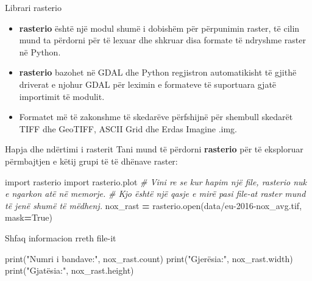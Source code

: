 \documentclass[
  ignorenonframetext,
]{beamer}
\newenvironment{Shaded}{\begin{snugshade}}{\end{snugshade}}
\newcommand{\BuiltInTok}[1]{#1}
\newcommand{\CommentTok}[1]{\textcolor[rgb]{0.56,0.35,0.01}{\textit{#1}}}
\newcommand{\ImportTok}[1]{#1}
\newcommand{\NormalTok}[1]{#1}
\newcommand{\OperatorTok}[1]{\textcolor[rgb]{0.81,0.36,0.00}{\textbf{#1}}}
\newcommand{\StringTok}[1]{\textcolor[rgb]{0.31,0.60,0.02}{#1}}
\newcommand{\VariableTok}[1]{\textcolor[rgb]{0.00,0.00,0.00}{#1}}
\begin{document}
\begin{frame}{Librari rasterio}
\protect\hypertarget{librari-rasterio}{}
\begin{itemize}
\item
  \textbf{rasterio} është një modul shumë i dobishëm për përpunimin
  raster, të cilin mund ta përdorni për të lexuar dhe shkruar disa
  formate të ndryshme raster në Python.
\item
  \textbf{rasterio} bazohet në GDAL dhe Python regjistron automatikisht
  të gjithë driverat e njohur GDAL për leximin e formateve të suportuara
  gjatë importimit të modulit.
\item
  Formatet më të zakonshme të skedarëve përfshijnë për shembull skedarët
  TIFF dhe GeoTIFF, ASCII Grid dhe Erdas Imagine .img.
\end{itemize}
\end{frame}

\begin{frame}[fragile]{Hapja dhe ndërtimi i rasterit}
\protect\hypertarget{hapja-dhe-nduxebrtimi-i-rasterit-3}{}
Tani mund të përdorni \textbf{rasterio} për të eksploruar përmbajtjen e
këtij grupi të të dhënave raster:


\begin{Shaded}
\begin{Highlighting}[]
\ImportTok{import}\NormalTok{ rasterio}
\ImportTok{import}\NormalTok{ rasterio.plot}
\CommentTok{\# Vini re se kur hapim një file, rasterio nuk e ngarkon atë në memorje.}
\CommentTok{\# Kjo është një qasje e mirë pasi file{-}at raster mund të jenë shumë të mëdhenj.}
\NormalTok{nox\_rast }\OperatorTok{=}\NormalTok{ rasterio.}\BuiltInTok{open}\NormalTok{(}\StringTok{\textquotesingle{}data/eu{-}2016{-}nox\_avg.tif\textquotesingle{}}\NormalTok{, mask}\OperatorTok{=}\VariableTok{True}\NormalTok{)}
\end{Highlighting}
\end{Shaded}
\end{frame}

\begin{frame}[fragile]{Shfaq informacion rreth file-it}
\protect\hypertarget{shfaq-informacion-rreth-file-it}{}

\begin{Shaded}
\begin{Highlighting}[]
\BuiltInTok{print}\NormalTok{(}\StringTok{"Numri i bandave:"}\NormalTok{, nox\_rast.count)}
\BuiltInTok{print}\NormalTok{(}\StringTok{"Gjerësia:"}\NormalTok{, nox\_rast.width)}
\BuiltInTok{print}\NormalTok{(}\StringTok{"Gjatësia:"}\NormalTok{, nox\_rast.height)}
\end{Highlighting}
\end{Shaded}
\end{frame}
\end{document}
